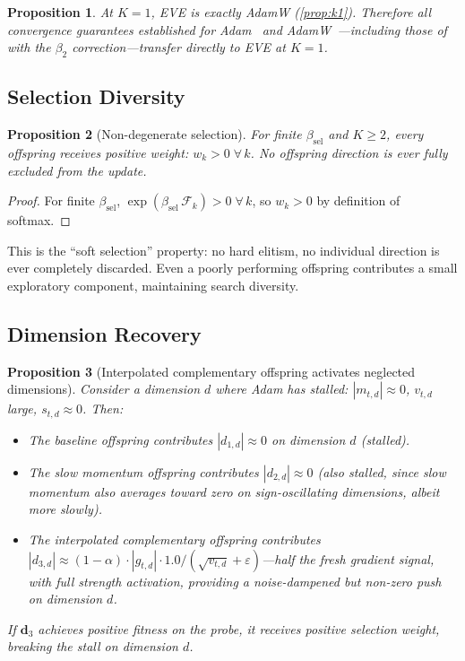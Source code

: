 \documentclass[12pt]{article}
\newtheorem{proposition}{Proposition}
\begin{document}
\begin{proposition}
At $K = 1$, EVE is exactly AdamW (\cref{prop:k1}).
Therefore all convergence guarantees established for
Adam~\cite{kingma2015adam} and
AdamW~\cite{loshchilov2019decoupled}---including those of
\cite{reddi2018convergence} with the $\beta_2$ correction---transfer
directly to EVE at $K = 1$.
\end{proposition}

\subsection{Selection Diversity}

\begin{proposition}[Non-degenerate selection]
\label{prop:diversity}
For finite $\beta_{\mathrm{sel}}$ and $K \geq 2$, every offspring
receives positive weight: $w_k > 0\;\forall\,k$.
No offspring direction is ever fully excluded from the update.
\end{proposition}

\begin{proof}
For finite $\beta_{\mathrm{sel}}$,
$\exp(\beta_{\mathrm{sel}}\,\mathcal{F}_k) > 0\;\forall\,k$,
so $w_k > 0$ by definition of softmax.
\end{proof}

This is the ``soft selection'' property: no hard elitism, no individual
direction is ever completely discarded.
Even a poorly performing offspring contributes a small exploratory
component, maintaining search diversity.

\subsection{Dimension Recovery}

\begin{proposition}[Interpolated complementary offspring activates neglected dimensions]
\label{prop:recovery}
Consider a dimension $d$ where Adam has stalled:
$|m_{t,d}| \approx 0$, $v_{t,d}$ large, $s_{t,d} \approx 0$.
Then:
\begin{itemize}[leftmargin=1.6em, itemsep=2pt]
  \item The baseline offspring contributes $|d_{1,d}| \approx 0$ on
    dimension $d$ (stalled).
  \item The slow momentum offspring contributes $|d_{2,d}| \approx 0$
    (also stalled, since slow momentum also averages toward zero on
    sign-oscillating dimensions, albeit more slowly).
  \item The interpolated complementary offspring contributes
    $|d_{3,d}| \approx (1 - \alpha) \cdot |g_{t,d}| \cdot 1.0
    / (\sqrt{v_{t,d}} + \varepsilon)$---half the fresh gradient signal,
    with full strength activation, providing a noise-dampened but
    non-zero push on dimension $d$.
\end{itemize}
If $\mathbf{d}_3$ achieves positive fitness on the probe, it receives
positive selection weight, breaking the stall on dimension $d$.
\end{proposition}
\end{document}
